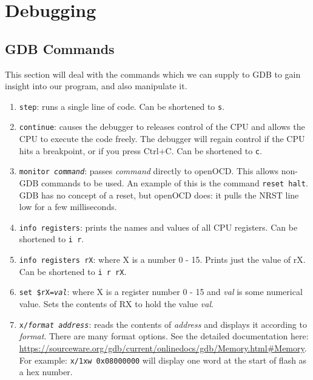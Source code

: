 \chapter{Debugging}

\section{GDB Commands}
This section will deal with the commands which we can supply to GDB to gain insight into our program, and also manipulate it.

\begin{enumerate}
  \item \texttt{step}: runs a single line of code. Can be shortened to \texttt{s}.
  \item \texttt{continue}: causes the debugger to releases control of the CPU and allows the CPU to execute the code freely. The debugger will regain control if the CPU hits a breakpoint, or if you press Ctrl+C. Can be shortened to \texttt{c}.
  \item \texttt{monitor \textit{command}}: passes \textit{command} directly to openOCD. This allows non-GDB commands to be used. An example of this is the command \texttt{reset halt}. GDB has no concept of a reset, but openOCD does: it pulls the NRST line low for a few milliseconds. 
  \item \texttt{info registers}: prints the names and values of all CPU registers. Can be shortened to \texttt{i r}.
  \item \texttt{info registers rX}: where X is a number 0 - 15. Prints just the value of rX. Can be shortened to \texttt{i r rX}.
  \item \texttt{set \$rX=\textit{val}}: where X is a register number 0 - 15 and \textit{val} is some numerical value. Sets the contents of RX to hold the value \textit{val}.
  \item \texttt{x/\textit{format} \textit{address}}: reads the contents of \textit{address} and displays it according to \textit{format}. There are many format options. See the detailed documentation here: \url{https://sourceware.org/gdb/current/onlinedocs/gdb/Memory.html#Memory}. For example: \texttt{x/1xw 0x08000000} will display one word at the start of flash as a hex number.
\end{enumerate}

